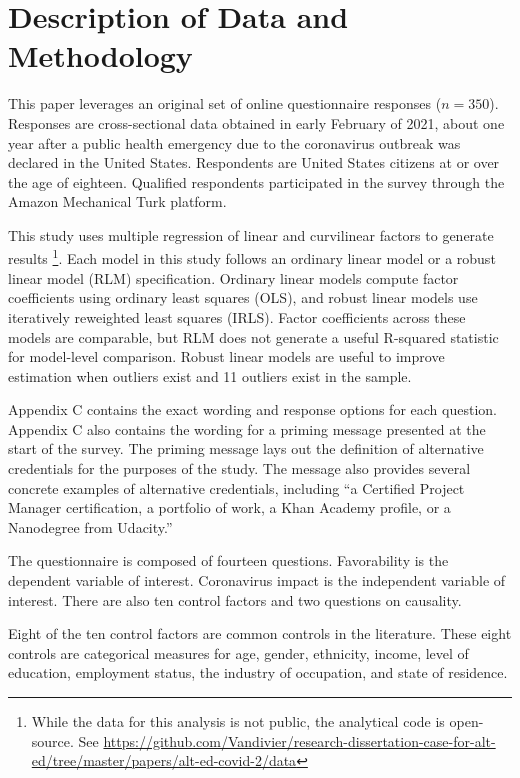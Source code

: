 \section{Description of Data and Methodology}

This paper leverages an original set of online questionnaire responses ($n = 350$).
Responses are cross-sectional data obtained in early February of 2021,
about one year after a public health emergency due to the coronavirus outbreak was declared in the United States\cite{staff_2021}.
Respondents are United States citizens at or over the age of eighteen.
Qualified respondents participated in the survey through the Amazon Mechanical Turk platform.

This study uses multiple regression of linear and curvilinear factors to generate results
\footnote{
    While the data for this analysis is not public, the analytical code is open-source.
    See \url{https://github.com/Vandivier/research-dissertation-case-for-alt-ed/tree/master/papers/alt-ed-covid-2/data}
}.
Each model in this study follows an ordinary linear model or a robust linear model (RLM) specification.
Ordinary linear models compute factor coefficients using ordinary least squares (OLS),
and robust linear models use iteratively reweighted least squares (IRLS).
Factor coefficients across these models are comparable,
but RLM does not generate a useful R-squared statistic
for model-level comparison.
Robust linear models are useful to improve estimation when outliers exist\cite{sievers2004rank}
and 11 outliers exist in the sample.

Appendix C contains the exact wording and response options for each question.
Appendix C also contains the wording for a priming message presented at the start of the survey.
The priming message lays out the definition of alternative credentials for the purposes of the study.
The message also provides several concrete examples of alternative credentials,
including ``a Certified Project Manager certification,
a portfolio of work, a Khan Academy profile, or a Nanodegree from Udacity.''

The questionnaire is composed of fourteen questions.
Favorability is the dependent variable of interest.
Coronavirus impact is the independent variable of interest.
There are also ten control factors and two questions on causality.

Eight of the ten control factors are common controls in the literature.
These eight controls are categorical measures
for age, gender, ethnicity, income,
level of education, employment status, the industry of occupation, and state of residence.

